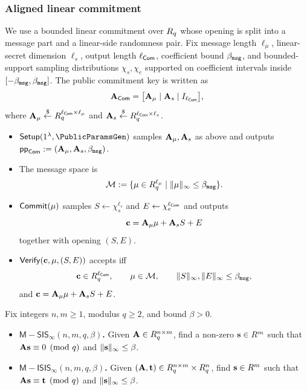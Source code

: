 \subsubsection{Aligned linear commitment}
We use a bounded linear commitment over \(R_q\) whose opening is split into a message part and a linear-side
randomness pair. Fix message length \(\ell_\mu\), linear-secret dimension \(\ell_s\), output length
\(\ell_{\mathsf{Com}}\), coefficient bound \(\beta_{\mathtt{msg}}\), and bounded-support sampling distributions
\(\chi_s,\chi_e\) supported on coefficient intervals inside \([-\beta_{\mathtt{msg}},\beta_{\mathtt{msg}}]\). The public commitment key is
written as
\[
  \mathbf{A}_{\mathsf{Com}}=\bigl[\mathbf{A}_\mu \mid \mathbf{A}_s \mid I_{\ell_{\mathsf{Com}}}\bigr],
\]
where \(\mathbf{A}_\mu\overset{\$}{\leftarrow} R_q^{\ell_{\mathsf{Com}}\times \ell_\mu}\) and
\(\mathbf{A}_s\overset{\$}{\leftarrow} R_q^{\ell_{\mathsf{Com}}\times \ell_s}\).
\begin{itemize}
  \item \(\ComSetup(\SecParam,\PublicParamsGen)\) samples \(\mathbf{A}_\mu,\mathbf{A}_s\) as above and outputs
  \(\mathsf{pp}_{\mathsf{Com}}:=(\mathbf{A}_\mu,\mathbf{A}_s,\beta_{\mathtt{msg}})\).
  \item The message space is
  \[
    \mathcal{M}:=\{\mathbf{\mu}\in R_q^{\ell_\mu}\mid \|\mathbf{\mu}\|_\infty\le \beta_{\mathtt{msg}}\}.
  \]
  \item \(\mathsf{Commit}(\mathbf{\mu})\) samples \(S\gets \chi_s^{\ell_s}\) and
  \(E\gets \chi_e^{\ell_{\mathsf{Com}}}\) and outputs
  \[
    \mathbf{c}=\mathbf{A}_\mu\mathbf{\mu}+\mathbf{A}_s S + E
  \]
  together with opening \((S,E)\).
  \item \(\mathsf{Verify}(\mathbf{c},\mathbf{\mu},(S,E))\) accepts iff
  \[
    \mathbf{c}\in R_q^{\ell_{\mathsf{Com}}},\qquad
    \mathbf{\mu}\in\mathcal{M},\qquad
    \|S\|_\infty,\|E\|_\infty\le \beta_{\mathtt{msg}},
  \]
  and \(\mathbf{c}=\mathbf{A}_\mu\mathbf{\mu}+\mathbf{A}_s S + E\).
\end{itemize}

\begin{definition}\label{def:sis-isis}
Fix integers \(n,m\ge 1\), modulus \(q\ge 2\), and bound \(\beta>0\).
\begin{itemize}[leftmargin=1.25em]
  \item \textbf{\(\mathsf{M-SIS}_\infty(n,m,q,\beta)\).} Given \(\mathbf{A}\in R_q^{n\times m}\), find a non-zero
  \(\mathbf{s}\in R^m\) such that \(\mathbf{A}\mathbf{s}\equiv 0 \pmod q\) and \(\|\mathbf{s}\|_\infty\le \beta\).
  \item \textbf{\(\mathsf{M-ISIS}_\infty(n,m,q,\beta)\).} Given \((\mathbf{A},\mathbf{t})\in R_q^{n\times m}\times R_q^n\), find
  \(\mathbf{s}\in R^m\) such that \(\mathbf{A}\mathbf{s}\equiv \mathbf{t} \pmod q\) and
  \(\|\mathbf{s}\|_\infty\le \beta\).
\end{itemize}
\end{definition}

